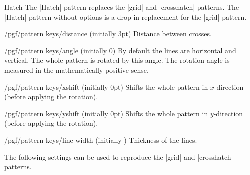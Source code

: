 \begin{pattern}{Hatch}
    The |Hatch| pattern replaces the |grid| and |crosshatch| patterns.
    The |Hatch| pattern without options is a drop-in replacement for the
    |grid| pattern.
    \begin{key}{/pgf/pattern keys/distance (initially 3pt)}
        Distance between crosses.
    \end{key}
    \begin{key}{/pgf/pattern keys/angle (initially 0)}
        By default the lines are horizontal and vertical. The whole pattern is
        rotated by this angle. The rotation angle is measured in the
        mathematically positive sense.
    \end{key}
    \begin{key}{/pgf/pattern keys/xshift (initially 0pt)}
        Shifts the whole pattern in $x$-direction (before applying the
        rotation).
    \end{key}
    \begin{key}{/pgf/pattern keys/yshift (initially 0pt)}
        Shifts the whole pattern in $y$-direction (before applying the
        rotation).
    \end{key}
    \begin{key}{/pgf/pattern keys/line width (initially \string\the\string\pgflinewidth)}
        Thickness of the lines.
    \end{key}
    The following settings can be used to reproduce the |grid| and
    |crosshatch| patterns.
\begin{codeexample}[preamble={\usetikzlibrary{patterns.meta}}]
\end{codeexample}
\end{pattern}


